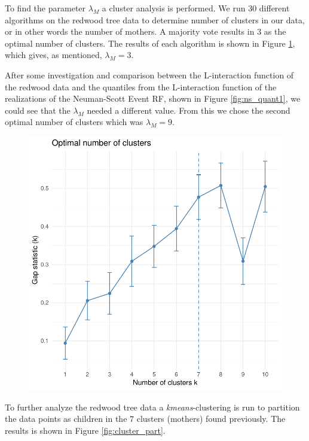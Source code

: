 To find the parameter $\lambda_M$ a cluster analysis is performed. We run 30 different algorithms on the redwood tree data to determine number of clusters in our data, or in other words the number of mothers. A majority vote results in 3 as the optimal number of clusters. The results of each algorithm is shown in Figure \ref{fig:numb_clust}, which gives, as mentioned, $\lambda_M = 3$.

After some investigation and comparison between the L-interaction function of the redwood data and the quantiles from the L-interaction function of the realizations of the Neuman-Scott Event RF, shown in Figure \ref{fig:ns_quant1}, we could see that the $\lambda_M$ needed a different value. From this we chose the second optimal number of clusters which was $\lambda_M = 9$. 

\begin{figure}
    \centering
    \includegraphics[scale=0.95]{figures/numb_clusters.pdf}
    \caption{}
    \label{fig:numb_clust}
\end{figure}

To further analyze the redwood tree data a \textit{kmeans}-clustering is run to partition the data points as children in the $7$ clusters (mothers) found previously. The results is shown in Figure \ref{fig:cluster_part}. 

